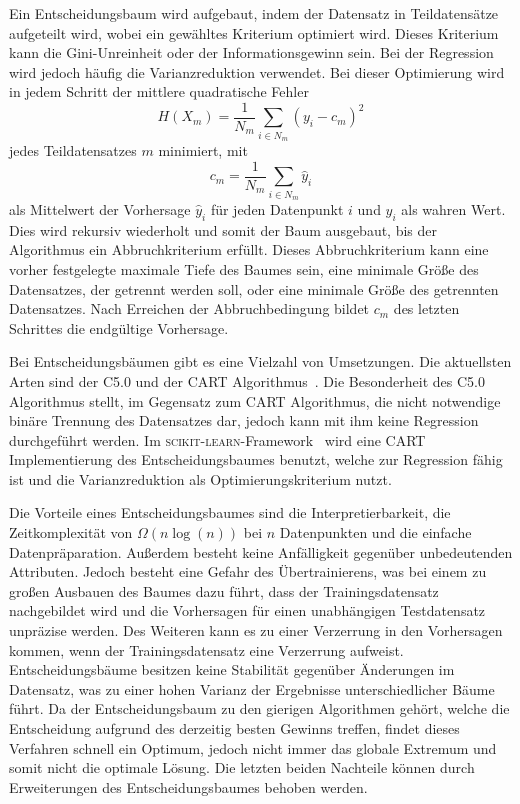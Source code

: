 Ein Entscheidungsbaum wird aufgebaut, indem der Datensatz in Teildatensätze aufgeteilt wird, wobei ein gewähltes Kriterium optimiert wird.
Dieses Kriterium
kann die Gini-Unreinheit oder der Informationsgewinn sein.
Bei der Regression wird jedoch häufig die Varianzreduktion verwendet.
Bei dieser Optimierung wird in jedem Schritt der mittlere quadratische Fehler
\begin{equation}
  H(X_m) = \frac{1}{N_m}\sum_{i\in N_m}(y_i-c_m)^2
\end{equation}
jedes Teildatensatzes $m$ minimiert, mit
\begin{equation}
  c_m = \frac{1}{N_m}\sum_{i\in N_m}\hat{y}_i
\end{equation}
als Mittelwert der Vorhersage $\hat{y}_i$ für jeden Datenpunkt $i$ und $y_i$ als wahren Wert.
Dies wird rekursiv wiederholt und somit der Baum ausgebaut, bis der Algorithmus ein Abbruchkriterium erfüllt.
Dieses Abbruchkriterium kann eine vorher festgelegte maximale Tiefe
des Baumes sein, eine minimale Größe des Datensatzes, der getrennt werden soll, oder eine minimale Größe des getrennten Datensatzes. Nach Erreichen der Abbruchbedingung bildet
$c_m$ des letzten Schrittes die endgültige Vorhersage.

Bei Entscheidungsbäumen gibt es eine Vielzahl von Umsetzungen.
Die aktuellsten Arten sind der C5.0 und der CART Algorithmus~\cite[1]{CART}.
Die Besonderheit des C5.0 Algorithmus stellt, im Gegensatz zum CART Algorithmus, die nicht notwendige binäre Trennung des Datensatzes dar,
jedoch kann mit ihm keine Regression durchgeführt werden.
Im \textsc{scikit-learn}-Framework~\cite{scikit-learn} wird eine CART Implementierung des Entscheidungsbaumes benutzt, welche zur
Regression fähig ist und die Varianzreduktion als Optimierungskriterium nutzt.

Die Vorteile eines Entscheidungsbaumes sind die Interpretierbarkeit, die Zeitkomplexität von $\Omega(n\log(n))$ bei $n$ Datenpunkten und die einfache Datenpräparation.
Außerdem besteht keine Anfälligkeit gegenüber unbedeutenden Attributen.
Jedoch besteht eine Gefahr des Übertrainierens, was bei einem zu großen Ausbauen des Baumes dazu führt, dass der Trainingsdatensatz nachgebildet
wird und die Vorhersagen für einen unabhängigen Testdatensatz unpräzise werden.
Des Weiteren kann es zu einer Verzerrung in den Vorhersagen kommen, wenn der Trainingsdatensatz eine Verzerrung aufweist.
Entscheidungsbäume besitzen keine Stabilität gegenüber Änderungen im Datensatz, was zu einer hohen Varianz der Ergebnisse
unterschiedlicher Bäume führt.
Da der Entscheidungsbaum zu den gierigen Algorithmen gehört, welche die Entscheidung aufgrund des derzeitig besten Gewinns treffen, findet dieses Verfahren schnell ein
Optimum, jedoch nicht immer das globale Extremum und somit nicht die optimale Lösung.
Die letzten beiden Nachteile können durch Erweiterungen des Entscheidungsbaumes behoben werden.

